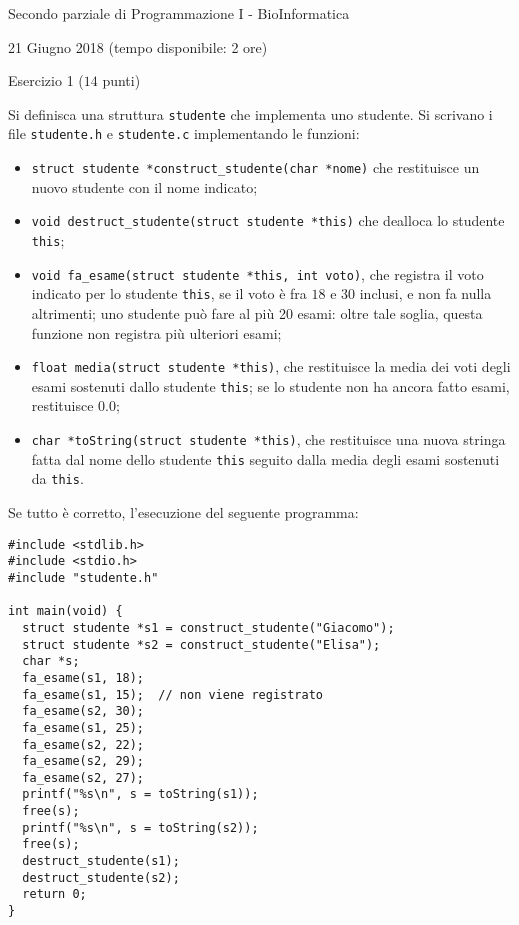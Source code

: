\documentclass[12pt]{article}
\begin{document}
\begin{center}
{\LARGE Secondo parziale di Programmazione I - BioInformatica}\\
\vspace*{-2ex}
\begin{center}
{\large 21 Giugno 2018 (tempo disponibile: 2 ore)}
\end{center}
\end{center}

\begin{center}
{\Large Esercizio 1} ($14$ punti)
\end{center}

Si definisca una struttura \texttt{studente} che implementa uno studente.
Si scrivano i file \texttt{studente.h} e \texttt{studente.c} implementando le funzioni:
%
\begin{itemize}
\itemsep0em 
\item \texttt{struct studente *construct\_studente(char *nome)} che restituisce un
      nuovo studente con il nome indicato;
\item \texttt{void destruct\_studente(struct studente *this)} che dealloca lo studente \texttt{this};
\item \texttt{void fa\_esame(struct studente *this, int voto)},
      che registra il voto indicato per lo studente \texttt{this}, se il voto \`e
      fra $18$ e $30$ inclusi, e non fa nulla altrimenti; uno studente pu\`o fare al pi\`u 20 esami:
      oltre tale soglia, questa funzione non registra pi\`u ulteriori esami;
\item \texttt{float media(struct studente *this)}, che restituisce la media dei voti
      degli esami sostenuti dallo studente \texttt{this}; se lo studente non ha ancora fatto esami,
      restituisce $0.0$;
\item \texttt{char *toString(struct studente *this)}, che restituisce una nuova stringa
      fatta dal nome dello studente \texttt{this} seguito dalla media degli esami sostenuti da
      \texttt{this}.
\end{itemize}
%
Se tutto \`e corretto, l'esecuzione del seguente programma:

\begin{lstlisting}
#include <stdlib.h>
#include <stdio.h>
#include "studente.h"

int main(void) {
  struct studente *s1 = construct_studente("Giacomo");
  struct studente *s2 = construct_studente("Elisa");
  char *s;
  fa_esame(s1, 18);
  fa_esame(s1, 15);  // non viene registrato
  fa_esame(s2, 30);
  fa_esame(s1, 25);
  fa_esame(s2, 22);
  fa_esame(s2, 29);
  fa_esame(s2, 27);
  printf("%s\n", s = toString(s1));
  free(s);
  printf("%s\n", s = toString(s2));
  free(s);
  destruct_studente(s1);
  destruct_studente(s2);
  return 0;
}
\end{lstlisting}
\end{document}
